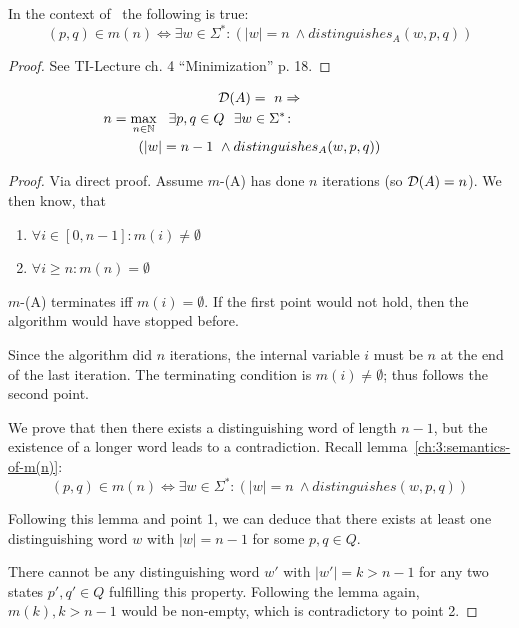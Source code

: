 \begin{lemma}[Semantics of $(p,q) \in m(n)$] \label{ch:3:semantics-of-m(n)}
    In the context of \CompDist\ the following is true:
    \[
        (p,q) \in m(n) \Longleftrightarrow \exists w\in\Sigma^*\colon (|w| = n\ \land distinguishes_A(w, p, q))
    \]
\end{lemma}

\begin{proof}
	See TI-Lecture ch. 4 ``Minimization'' p. 18.
\end{proof}

\begin{lemma}[Semantics of $\mmD(A) = n$] \label{ch:3:semantics-of-D(A)}
	\begin{multline*}
		\mmD(A) =\ n \Rightarrow \\
		n = \max_{n \in \mathbb{N}}\ \ \exists p, q \in Q\ \ \exists w \in \Sigma^* \colon \hspace{3cm} \\
		(|w| = n - 1\ \land distinguishes_A(w, p, q))
	\end{multline*}
\end{lemma}

\begin{proof}
		Via direct proof. Assume $m$-\CompDist(A) has done $n$ iterations (so $\mmD(A) = n$). We then know, that
		\begin{enumerate}
			\item $\forall i \in [0,n-1]\colon m(i) \neq \emptyset$
			\item $\forall i \geq n\colon m(n)= \emptyset$ 
		\end{enumerate}
		$m$-\CompDist(A) terminates iff $m(i) = \emptyset$. If the first point would not hold, then the algorithm would have stopped before.
		
		Since the algorithm did $n$ iterations, the internal variable $i$ must be $n$ at the end of the last iteration. The terminating condition is $m(i) \neq \emptyset$; thus follows the second point.
        
        We prove that then there exists a distinguishing word of length $n-1$, but the existence of a longer word leads to a contradiction. Recall lemma~\ref{ch:3:semantics-of-m(n)}:
        \[
            (p,q) \in m(n) \Longleftrightarrow \exists w\in\Sigma^*\colon (|w| = n\ \land distinguishes(w, p, q))
        \]
	
		
		\noindent Following this lemma and point 1, we can deduce that there exists at least one distinguishing word $w$ with $|w| = n-1$ for some $p,q \in Q$.
		
		
		There cannot be any distinguishing word $w'$ with $|w'| = k > n-1$ for any two states $p',q'\in Q$ fulfilling this property. Following the lemma again, $m(k), k > n-1$ would be non-empty, which is contradictory to point 2.
\end{proof}

